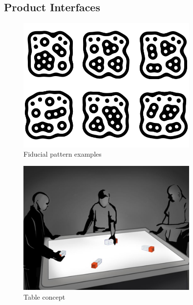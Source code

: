 \subsection{Product Interfaces}

\begin{figure}[H]
	\centering
   	\includegraphics[width=0.8\textwidth]{images/reactivision02}
    \caption{Fiducial pattern examples}
\end{figure}

\begin{figure}[H]
	\centering
   	\includegraphics[width=0.8\textwidth]{images/Concept_Sketches_03}
    \caption{Table concept \cite{concept1}}
\end{figure}

